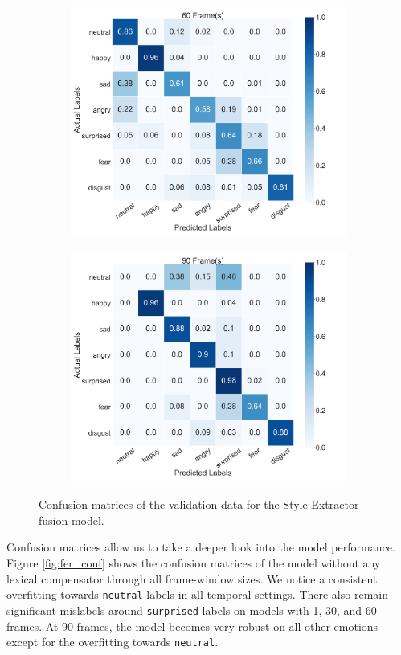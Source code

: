\begin{figure}
\begin{subfigure}[b]{0.45\textwidth}
      \includegraphics[width=\textwidth]{res/conf_busso_60.png}
    \end{subfigure}
    \begin{subfigure}[b]{0.45\textwidth}
      \includegraphics[width=\textwidth]{res/conf_busso_90.png}
    \end{subfigure}
    \caption{Confusion matrices of the validation data for the Style Extractor fusion model.}
    \label{fig:lipnet_conf}
\end{figure}


Confusion matrices allow us to take a deeper look into the model performance. Figure \ref{fig:fer_conf} shows the confusion matrices of the model without any lexical compensator through all frame-window sizes. We notice a consistent overfitting towards \texttt{neutral} labels in all temporal settings. There also remain significant mislabels around \texttt{surprised} labels on models with 1, 30, and 60 frames. At 90 frames, the model becomes very robust on all other emotions except for the overfitting towards \texttt{neutral}.

